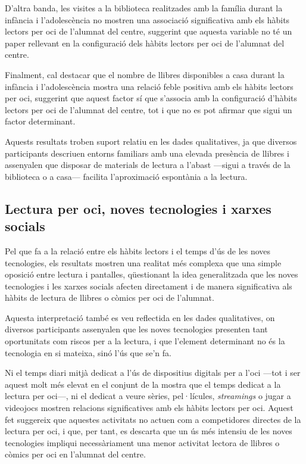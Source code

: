 \documentclass[12pt]{article}
\begin{document}
D'altra banda, les visites a la biblioteca realitzades amb la família durant la infància i l'adolescència no mostren una associació significativa amb els hàbits lectors per oci de l’alumnat del centre, suggerint que aquesta variable no té un paper rellevant en la configuració dels hàbits lectors per oci de l’alumnat del centre. 

Finalment, cal destacar que el nombre de llibres disponibles a casa durant la infància i l'adolescència mostra una relació feble positiva amb els hàbits lectors per oci, suggerint que aquest factor sí que s'associa amb la configuració d'hàbits lectors per oci de l’alumnat del centre, tot i que no es pot afirmar que sigui un factor determinant.

Aquests resultats troben suport relatiu en les dades qualitatives, ja que diversos participants descriuen entorns familiars amb una elevada presència de llibres i assenyalen que disposar de materials de lectura a l’abast ---sigui a través de la biblioteca o a casa--- facilita l’aproximació espontània a la lectura.

\subsection{Lectura per oci, noves tecnologies i xarxes socials}
Pel que fa a la relació entre els hàbits lectors i el temps d'ús de les noves tecnologies, els resultats mostren una realitat més complexa que una simple oposició entre lectura i pantalles, qüestionant la idea generalitzada que les noves tecnologies i les xarxes socials afecten directament i de manera significativa als hàbits de lectura de llibres o còmics per oci de l'alumnat. 

Aquesta interpretació també es veu reflectida en les dades qualitatives, on diversos participants assenyalen que les noves tecnologies presenten tant oportunitats com riscos per a la lectura, i que l'element determinant no és la tecnologia en si mateixa, sinó l'ús que se'n fa.

Ni el temps diari mitjà dedicat a l’ús de dispositius digitals per a l’oci ---tot i ser aquest molt més elevat en el conjunt de la mostra que el temps dedicat a la lectura per oci---,  ni el dedicat a veure sèries, pel·lícules, \emph{streamings} o jugar a videojocs mostren relacions significatives amb els hàbits lectors per oci. Aquest fet suggereix que aquestes activitats no actuen com a competidores directes de la lectura per oci, i que, per tant, es descarta que un ús més intensiu de les noves tecnologies impliqui necessàriament una menor activitat lectora de llibres o còmics per oci en l'alumnat del centre.
\end{document}
